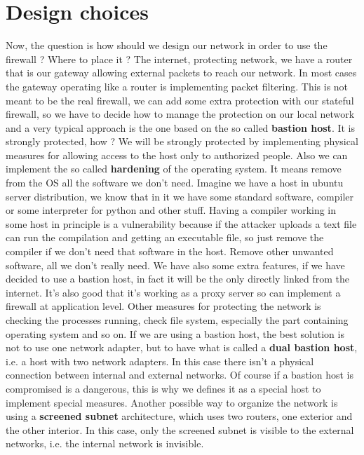 \documentclass[11pt]{article}
\begin{document}
\section{Design choices}
Now, the question is how should we design our network in order to use the firewall ? Where to place it ? The internet, protecting network, we have a router that is our gateway allowing external packets to reach our network. In most cases the gateway operating like a router is implementing packet filtering. This is not meant to be the real firewall, we can add some extra protection with our stateful firewall, so we have to decide how to manage the protection on our local network and a very typical approach is the one based on the so called \textbf{bastion host}. It is strongly protected, how ? We will be strongly protected by implementing physical measures for allowing access to the host only to authorized people. Also we can implement the so called \textbf{hardening} of the operating system. It means remove from the OS all the software we don't need. Imagine we have a host in ubuntu server distribution, we know that in it we have some standard software, compiler or some interpreter for python and other stuff. Having a compiler working in some host in principle is a vulnerability because if the attacker uploads a text file can run the compilation and getting an executable file, so just remove the compiler if we don't need that software in the host. Remove other unwanted software, all we don't really need. We have also some extra features, if we have decided to use a bastion host, in fact it will be the only directly linked from the internet. It's also good that it's working as a proxy server so can implement a firewall at application level. Other measures for protecting the network is checking the processes running, check file system, especially the part containing operating system and so on. If we are using a bastion host, the best solution is not to use one network adapter, but to have what is called a \textbf{dual bastion host}, i.e. a host with two network adapters. In this case there isn't a physical connection between internal and external networks. Of course if a bastion host is compromised is a dangerous, this is why we defines it as a special host to implement special measures. Another possible way to organize the network is using a \textbf{screened subnet} architecture, which uses two routers, one exterior and the other interior. In this case, only the screened subnet is visible to the external networks, i.e. the internal network is invisible.
\end{document}
